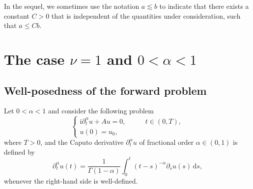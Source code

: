 \documentclass[reqno]{amsart}
\numberwithin{equation}{section}
\def \d {\mathrm{d}}
\begin{document}
In the sequel, we sometimes use the notation $a \lesssim b$ to indicate that there exists a constant $C > 0$ that is independent of the quantities under consideration, such that $a \le C b$.

\section{The case $\nu=1$ and $0<\alpha<1$}\label{sec3}
\subsection{Well-posedness of the forward problem}
Let $0<\alpha<1$ and consider the following problem
\begin{equation}\label{fseq}
\begin{cases}
\mathrm{i}\partial_t^\alpha u +Au=0, &\qquad t \in (0,T),\\
u(0)=u_0,
\end{cases}
\end{equation}
where $T>0$, and the Caputo derivative $\partial_t^\alpha u$ of fractional order $\alpha\in (0,1)$ is defined by
\begin{equation}\label{cap01}
\partial_t^\alpha u(t)=\frac{1}{\Gamma(1-\alpha)} \int_0^t(t-s)^{-\alpha}\partial_s u(s)\, \d s,
\end{equation}
whenever the right-hand side is well-defined.
\end{document}
